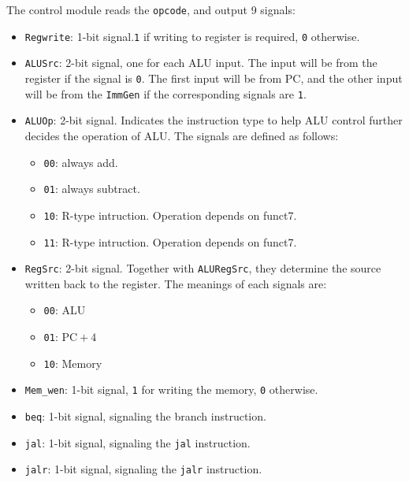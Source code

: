 \documentclass[12pt]{article}
\begin{document}
\indent The control module reads the \texttt{opcode}, and output 9 signals:
\begin{itemize}
	\item \texttt{Regwrite}: 1-bit signal.\texttt{1} if writing to register is 
		required, \texttt{0} otherwise.

	\item \texttt{ALUSrc}: 2-bit signal, one for each ALU input. The input will
		be from the register if the signal is \texttt{0}. The first input will
		be from PC, and the other input will be from the \texttt{ImmGen} if the
		corresponding signals are \texttt{1}.

	\item \texttt{ALUOp}: 2-bit signal. Indicates the instruction type to help
		ALU control further decides the operation of ALU. The signals are defined
		as follows:
		\begin{itemize}
			\item \texttt{00}: always add.
			\item \texttt{01}: always subtract.
			\item \texttt{10}: R-type intruction. Operation depends on funct7.
			\item \texttt{11}: R-type intruction. Operation depends on funct7.
		\end{itemize}

	\item \texttt{RegSrc}: 2-bit signal. Together with \texttt{ALURegSrc}, they
		determine the source written back to the register. The meanings of each
		signals are:
		\begin{itemize}
			\item \texttt{00}: ALU
			\item \texttt{01}: $\text{PC}+4$
			\item \texttt{10}: Memory
		\end{itemize}

	\item \texttt{Mem\_wen}: 1-bit signal, \texttt{1} for writing the memory,
		\texttt{0} otherwise.

	\item \texttt{beq}: 1-bit signal, signaling the branch instruction.
	\item \texttt{jal}: 1-bit signal, signaling the \texttt{jal} instruction.
	\item \texttt{jalr}: 1-bit signal, signaling the \texttt{jalr} instruction.

\end{itemize}
\end{document}
